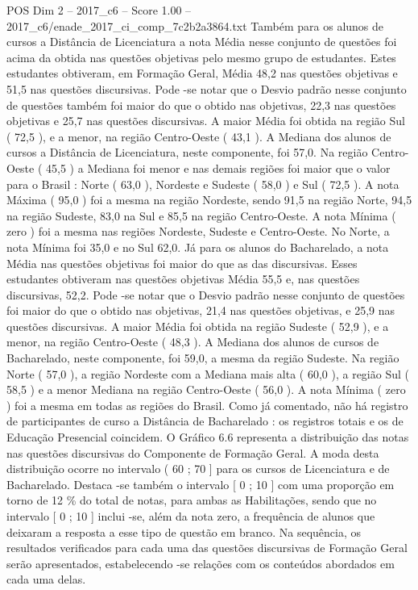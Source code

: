 \begin{textsample}{POS Dim 2 – 2017\_c6 – Score 1.00 – 2017\_c6/enade\_2017\_ci\_comp\_7c2b2a3864.txt}
Também para os alunos de cursos a Distância de Licenciatura a nota Média nesse conjunto de questões foi acima da obtida nas questões objetivas pelo mesmo grupo de estudantes.
Estes estudantes obtiveram, em Formação Geral, Média 48,2 nas questões objetivas e 51,5 nas questões discursivas.
Pode -se notar que o Desvio padrão nesse conjunto de questões também foi maior do que o obtido nas objetivas, 22,3 nas questões objetivas e 25,7 nas questões discursivas.
A maior Média foi obtida na região Sul ( 72,5 ), e a menor, na região Centro-Oeste ( 43,1 ).
A Mediana dos alunos de cursos a Distância de Licenciatura, neste componente, foi 57,0.
Na região Centro-Oeste ( 45,5 ) a Mediana foi menor e nas demais regiões foi maior que o valor para o Brasil : Norte ( 63,0 ), Nordeste e Sudeste ( 58,0 ) e Sul ( 72,5 ).
A nota Máxima ( 95,0 ) foi a mesma na região Nordeste, sendo 91,5 na região Norte, 94,5 na região Sudeste, 83,0 na Sul e 85,5 na região Centro-Oeste.
A nota Mínima ( zero ) foi a mesma nas regiões Nordeste, Sudeste e Centro-Oeste.
No Norte, a nota Mínima foi 35,0 e no Sul 62,0.
Já para os alunos do Bacharelado, a nota Média nas questões objetivas foi maior do que as das discursivas.
Esses estudantes obtiveram nas questões objetivas Média 55,5 e, nas questões discursivas, 52,2.
Pode -se notar que o Desvio padrão nesse conjunto de questões foi maior do que o obtido nas objetivas, 21,4 nas questões objetivas, e 25,9 nas questões discursivas.
A maior Média foi obtida na região Sudeste ( 52,9 ), e a menor, na região Centro-Oeste ( 48,3 ).
A Mediana dos alunos de cursos de Bacharelado, neste componente, foi 59,0, a mesma da região Sudeste.
Na região Norte ( 57,0 ), a região Nordeste com a Mediana mais alta ( 60,0 ), a região Sul ( 58,5 ) e a menor Mediana na região Centro-Oeste ( 56,0 ).
A nota Mínima ( zero ) foi a mesma em todas as regiões do Brasil.
Como já comentado, não há registro de participantes de curso a Distância de Bacharelado : os registros totais e os de Educação Presencial coincidem.
O Gráfico 6.6 representa a distribuição das notas nas questões discursivas do Componente de Formação Geral.
A moda desta distribuição ocorre no intervalo ( 60 ; 70 ] para os cursos de Licenciatura e de Bacharelado.
Destaca -se também o intervalo [ 0 ; 10 ] com uma proporção em torno de 12 \% do total de notas, para ambas as Habilitações, sendo que no intervalo [ 0 ; 10 ] inclui -se, além da nota zero, a frequência de alunos que deixaram a resposta a esse tipo de questão em branco.
Na sequência, os resultados verificados para cada uma das questões discursivas de Formação Geral serão apresentados, estabelecendo -se relações com os conteúdos abordados em cada uma delas.

\end{textsample}
